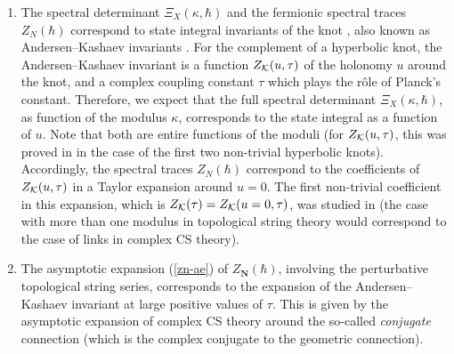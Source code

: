 \documentclass[a4paper,11pt]{article}
\theoremstyle{definition}
\newcommand{\CK}{{\cal K}}
\def\bN{{\boldsymbol{N}}}
\begin{document}
\begin{enumerate}

\item The spectral determinant $\Xi_X (\kappa, \hbar)$ and the
  fermionic spectral traces $Z_N (\hbar)$ correspond to state integral
  invariants of the knot \cite{hikami,dglz}, also known as
  Andersen--Kashaev invariants \cite{ak}. For the complement of a
  hyperbolic knot, the Andersen--Kashaev invariant is a function
  $Z_{\CK}(u, \tau)$ of the holonomy $u$ around the knot, and a
  complex coupling constant $\tau$ which plays the r\^ole of Planck's
  constant.  Therefore, we expect that the full spectral determinant
  $\Xi_X (\kappa, \hbar)$, as function of the modulus $\kappa$,
  corresponds to the state integral as a function of $u$. Note that
  both are entire functions of the moduli (for $Z_{\CK}(u, \tau)$,
  this was proved in \cite{ggm2} in the case of the first two
  non-trivial hyperbolic knots). Accordingly, the spectral traces
  $Z_N (\hbar)$ correspond to the coefficients of $Z_{\CK}(u, \tau)$
  in a Taylor expansion around $u=0$. The first non-trivial
  coefficient in this expansion, which is
  $Z_\CK(\tau)= Z_{\CK}(u=0, \tau)$, was studied in \cite{ggm1} (the
  case with more than one modulus in topological string theory would
  correspond to the case of links in complex CS theory).

\item The asymptotic expansion (\ref{zn-ae}) of $Z_{\bN}(\hbar)$,
  involving the perturbative topological string series, corresponds to
  the expansion of the Andersen--Kashaev invariant at large positive
  values of $\tau$. This is given by the asymptotic expansion of
  complex CS theory around the so-called {\it conjugate} connection
  (which is the complex conjugate to the geometric connection).


\end{enumerate}
\end{document}
